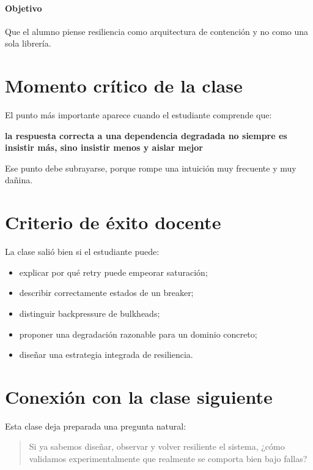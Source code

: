 \documentclass[variant=docente,cover=institutional,mode=screen]{ua-engineering-v6-article}
\begin{document}
\paragraph{Objetivo}
Que el alumno piense resiliencia como arquitectura de contención y no como una sola librería.

\section{Momento crítico de la clase}

El punto más importante aparece cuando el estudiante comprende que:

\begin{center}
\textbf{la respuesta correcta a una dependencia degradada no siempre es insistir más, sino insistir menos y aislar mejor}
\end{center}

Ese punto debe subrayarse, porque rompe una intuición muy frecuente y muy dañina.

\section{Criterio de éxito docente}

La clase salió bien si el estudiante puede:

\begin{itemize}
\item explicar por qué retry puede empeorar saturación;
\item describir correctamente estados de un breaker;
\item distinguir backpressure de bulkheads;
\item proponer una degradación razonable para un dominio concreto;
\item diseñar una estrategia integrada de resiliencia.
\end{itemize}

\section{Conexión con la clase siguiente}

Esta clase deja preparada una pregunta natural:

\begin{quote}
Si ya sabemos diseñar, observar y volver resiliente el sistema, ¿cómo validamos experimentalmente que realmente se comporta bien bajo fallas?
\end{quote}
\end{document}
